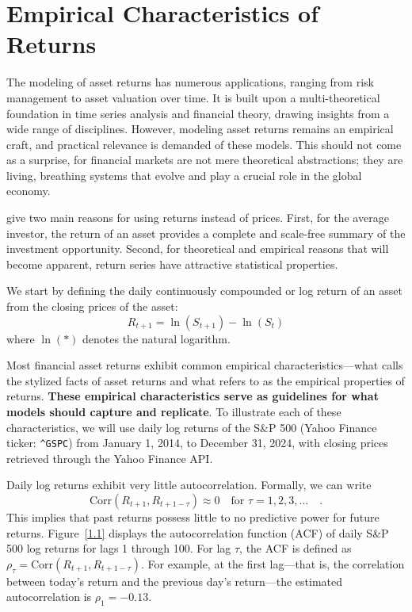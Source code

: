 \chapter{Empirical Characteristics of Returns}
\label{chap:1}

The modeling of asset returns has numerous applications, ranging from risk management to asset valuation over time. It is built upon a multi-theoretical foundation in time series analysis and financial theory, drawing insights from a wide range of disciplines. However, modeling asset returns remains an empirical craft, and practical relevance is demanded of these models. This should not come as a surprise, for financial markets are not mere theoretical abstractions; they are living, breathing systems that evolve and play a crucial role in the global economy.

 give two main reasons for using returns instead of prices. First, for the average investor, the return of an asset provides a complete and scale-free summary of the investment opportunity. Second, for theoretical and empirical reasons that will become apparent, return series have attractive statistical properties.

We start by defining the daily continuously compounded or log return of an asset from the closing prices of the asset:
\[
R_{t+1}=\ln(S_{t+1})-\ln(S_{t})
\]
where $\ln(*)$ denotes the natural logarithm.

Most financial asset returns exhibit common empirical characteristics—what  calls the stylized facts of asset returns and what  refers to as the empirical properties of returns. \textbf{These empirical characteristics serve as guidelines for what models should capture and replicate}. To illustrate each of these characteristics, we will use daily log returns of the S\&P 500 (Yahoo Finance ticker: \texttt{\textasciicircum{}GSPC}) from January 1, 2014, to December 31, 2024, with closing prices retrieved through the Yahoo Finance API.


Daily log returns exhibit very little autocorrelation. Formally, we can write
\[
\text{Corr}(R_{t+1},R_{t+1-\tau})\approx0 \quad \text{for } \tau = 1,2,3,\ldots \quad. 
\]
This implies that past returns possess little to no predictive power for future returns. Figure~\ref{1.1} displays the autocorrelation function (ACF) of daily S\&P 500 log returns for lags 1 through 100. For lag $\tau$, the ACF is defined as $\rho_\tau = \text{Corr}(R_{t+1},R_{t+1-\tau}).$ For example, at the first lag—that is, the correlation between today’s return and the previous day’s return—the estimated autocorrelation is $\rho_1 = -0.13$.

